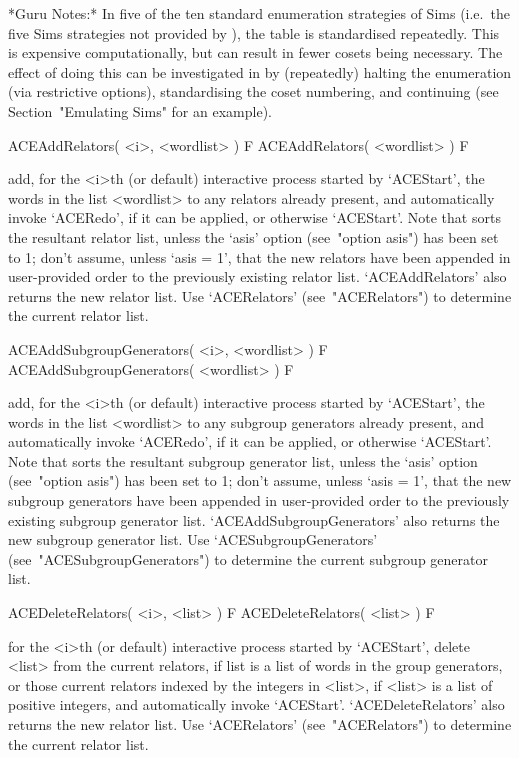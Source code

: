 *Guru Notes:*
In  five  of  the  ten  standard  enumeration   strategies   of   Sims
\cite{Sim94} (i.e.~the five Sims strategies not provided  by  {\ACE}),
the   table   is   standardised   repeatedly.   This   is    expensive
computationally, but can result in fewer cosets being  necessary.  The
effect of doing this can be investigated  in  {\ACE}  by  (repeatedly)
halting the enumeration (via restrictive options),  standardising  the
coset numbering, and continuing (see Section~"Emulating Sims"  for  an
example).

\>ACEAddRelators( <i>, <wordlist> ) F
\>ACEAddRelators( <wordlist> ) F

add, for the <i>th (or default) interactive {\ACE} process started  by
`ACEStart', the words in the list <wordlist> to any  relators  already
present, and automatically invoke `ACERedo', if it can be applied,  or
otherwise `ACEStart'. Note that {\ACE}  sorts  the  resultant  relator
list, unless the `asis' option (see~"option asis") has been set to  1;
don't assume, unless `asis = 1',  that  the  new  relators  have  been
appended in user-provided order to  the  previously  existing  relator
list.  `ACEAddRelators'  also  returns  the  new  relator  list.   Use
`ACERelators' (see~"ACERelators") to  determine  the  current  relator
list.

\>ACEAddSubgroupGenerators( <i>, <wordlist> ) F
\>ACEAddSubgroupGenerators( <wordlist> ) F

add, for the <i>th (or default) interactive {\ACE} process started  by
`ACEStart',  the  words  in  the  list  <wordlist>  to  any   subgroup
generators already present, and automatically invoke `ACERedo', if  it
can be applied, or otherwise `ACEStart'. Note that  {\ACE}  sorts  the
resultant  subgroup  generator  list,   unless   the   `asis'   option
(see~"option asis") has been set to 1; don't assume,  unless  `asis  =
1',  that  the  new  subgroup  generators  have   been   appended   in
user-provided order to  the  previously  existing  subgroup  generator
list.  `ACEAddSubgroupGenerators'  also  returns  the   new   subgroup
generator          list.          Use          `ACESubgroupGenerators'
(see~"ACESubgroupGenerators")  to  determine  the   current   subgroup
generator list.

\>ACEDeleteRelators( <i>, <list> ) F
\>ACEDeleteRelators( <list> ) F

for the <i>th (or  default)  interactive  {\ACE}  process  started  by
`ACEStart', delete <list> from the current relators, if list is a list
of words in the group generators, or those current relators indexed by
the integers in <list>, if <list> is a list of positive integers,  and
automatically invoke `ACEStart'. `ACEDeleteRelators' also returns  the
new relator list. Use `ACERelators' (see~"ACERelators")  to  determine
the current relator list.

